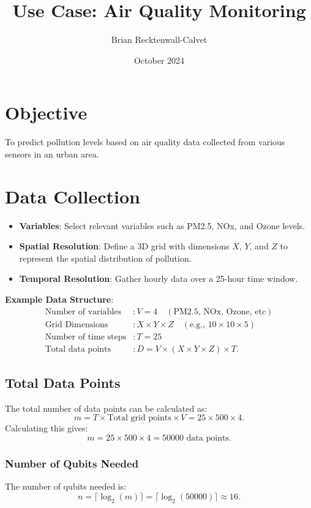 \documentclass{article}
\begin{document}
\title{Use Case: Air Quality Monitoring}
\author{Brian Recktenwall-Calvet}
\date{October 2024}
\maketitle

\section{Objective}
To predict pollution levels based on air quality data collected from various sensors in an urban area.

\section{Data Collection}
\begin{itemize}
    \item \textbf{Variables}: Select relevant variables such as PM2.5, NOx, and Ozone levels.
    \item \textbf{Spatial Resolution}: Define a 3D grid with dimensions \(X\), \(Y\), and \(Z\) to represent the spatial distribution of pollution.
    \item \textbf{Temporal Resolution}: Gather hourly data over a 25-hour time window.
\end{itemize}

\textbf{Example Data Structure}:
\noindent
\begin{align*}
    \text{Number of variables} & : V = 4 \quad (\text{PM2.5, NOx, Ozone, etc}) \\
    \text{Grid Dimensions} & : X \times Y \times Z \quad (\text{e.g., } 10 \times 10 \times 5) \\
    \text{Number of time steps} & : T = 25 \\
    \text{Total data points} & : D = V \times (X \times Y \times Z) \times T.
\end{align*}

\subsection{Total Data Points}
The total number of data points can be calculated as:
\[
m = T \times \text{Total grid points} \times V = 25 \times 500 \times 4.
\]
Calculating this gives:
\[
m = 25 \times 500 \times 4 = 50000 \text{ data points}.
\]

\subsubsection{Number of Qubits Needed}
The number of qubits needed is:
\[
n = \lceil \log_2(m) \rceil = \lceil \log_2(50000) \rceil \approx 16.
\]
\end{document}
